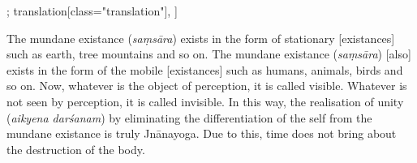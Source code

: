\begin{alignment}[
  texts=edition[class="edition"];
  translation[class="translation"],
  ]
\begin{translation}
\begin{tlate}
The mundane existance (\textit{saṃsāra}) exists in the form of stationary [existances] such as earth, tree mountains and so on. The mundane existance (\textit{saṃsāra}) [also] exists in the form of the mobile [existances] such as humans, animals, birds and so on.\textsuperscript{\coro{[\lowroman{10}]}} Now, whatever is the object of perception, it is called visible. Whatever is not seen by perception, it is called invisible. In this way, the realisation of unity (\textit{aikyena darśanam}) by eliminating the differentiation of the self from the mundane existance is truly Jnānayoga. Due to this, time does not bring about the destruction of the body.\textsuperscript{\coro{[\lowroman{14}]}}
    \end{tlate}
  \end{translation}
\end{alignment}
